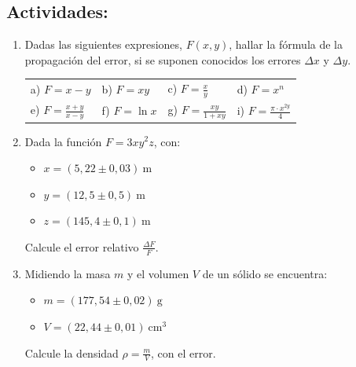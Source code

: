 \documentclass[12pt,a4paper]{article}
\begin{document}
\subsection*{Actividades:}
\begin{enumerate}
    \item Dadas las siguientes expresiones, $F(x, y)$, hallar la fórmula de la propagación del error, si se suponen conocidos los errores $\Delta x$ y $\Delta y$.
    
    \vspace{0.3cm}
    \begin{tabular}{@{}llll@{}}
        a) $F = x - y$ & \hspace{0.5cm} b) $F = xy$ & \hspace{0.5cm} c) $F = \frac{x}{y}$ & \hspace{0.5cm} d) $F = x^n$ \\[0.4cm]
        e) $F = \frac{x + y}{x - y}$ & \hspace{0.5cm} f) $F = \ln x$ & \hspace{0.5cm} g) $F = \frac{xy}{1 + xy}$ & \hspace{0.5cm} i) $F = \frac{\pi \cdot x^{2y}}{4}$
    \end{tabular}
    \vspace{0.3cm}
    
    \item Dada la función $F = 3xy^2z$, con:
    \begin{itemize}
        \item[] $x = (5,22 \pm 0,03)\ \text{m}$
        \item[] $y = (12,5 \pm 0,5)\ \text{m}$
        \item[] $z = (145,4 \pm 0,1)\ \text{m}$
    \end{itemize}
    Calcule el error relativo $\frac{\Delta F}{F}$.
    
    \item Midiendo la masa $m$ y el volumen $V$ de un sólido se encuentra:
    \begin{itemize}
        \item[] $m = (177,54 \pm 0,02)\ \text{g}$
        \item[] $V = (22,44 \pm 0,01)\ \text{cm}^3$
    \end{itemize}
    Calcule la densidad $\rho = \frac{m}{V}$, con el error.
\end{enumerate}
\end{document}
